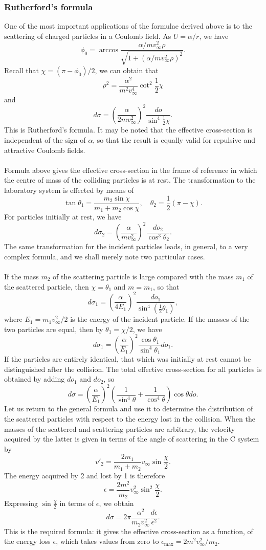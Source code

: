 \subsubsection{Rutherford's formula}
One of the most important applications of the formulae derived above is to the scattering of charged particles in a Coulomb field. As $U = {\alpha}/{r}$, we have
\[\phi_0 = \arccos \frac{\alpha/mv^2_{\infty}\rho}{\sqrt{1+(\alpha/mv^2_{\infty}\rho)^2}}.\]
Recall that $\chi = (\pi-\phi_0)/2$, we can obtain that
\[\rho^2 = \frac{\alpha^2}{m^2v_{\infty}^4} \cot^2 \frac{1}{2}\chi \]
and
\[d\sigma = \left( \frac{\alpha}{2mv_{\infty}^2} \right)^2 \frac{do}{\sin^4 \frac{1}{2}\chi}.\]
This is Rutherford's formula. It may be noted that the effective cross-section is independent of the sign of $\alpha$, so that the result is equally valid for repulsive and attractive Coulomb fields.
\\ \\
Formula above gives the effective cross-section in the frame of reference in which the centre of mass of the colliding particles is at rest. The transformation to the laboratory system is effected by means of
\[\tan\theta_1 = \frac{m_2\sin\chi}{m_1 + m_2 \cos\chi} ,\quad \theta_2 = \frac{1}{2}(\pi - \chi).\]
For particles initially at rest, we have
\[d\sigma_2 = \left ( \frac{\alpha}{mv^2_{\infty}} \right )^2 \frac{do_2}{\cos^3 \theta_2}.\]
The same transformation for the incident particles leads, in general, to a very complex formula, and we shall merely note two particular cases.
\\ \\
If the mass $m_2$ of the scattering particle is large compared with the mass $m_1$ of the scattered particle, then $\chi = \theta_1$ and $m = m_1$, so that
\[d\sigma_1 = \left ( \frac{\alpha}{4E_1}\right )^2 \frac{do_1}{\sin^4 (\frac{1}{2}\theta_1)} ,\]
where $E_1 = m_1v^2_{\infty}/2$ is the energy of the incident particle.
If the masses of the two particles are equal, then by $\theta_1 = {\chi}/{2}$, we have
\[d\sigma_1 =  \left ( \frac{\alpha}{E_1}\right )^2 \frac{\cos\theta_1}{\sin^4\theta_1} do_1.\]
If the particles are entirely identical, that which was initially at rest cannot be distinguished after the collision. The total effective cross-section for all
particles is obtained by adding $do_1$ and $do_2$, so
\[d\sigma = \left ( \frac{\alpha}{E_1}\right )^2 \left ( \frac{1}{\sin^4\theta} + \frac{1}{\cos^4\theta} \right )\cos\theta do.\]
Let us return to the general formula and use it to determine the distribution of the scattered particles with respect to the energy lost in the collision. 
When the masses of the scattered and scattering particles are arbitrary, the velocity acquired by the latter is given in terms of the angle of scattering in the C system by
\[v'_2 = \frac{2m_1}{m_1+m_2} v_{\infty} \sin \frac{\chi}{2}.\]
The energy acquired by 2 and lost by 1 is therefore
\[\epsilon = \frac{2m^2}{m_2} v_{\infty}^2 \sin^2 \frac{\chi}{2} .\]
Expressing $\sin \frac{\chi}{2}$ in terms of $\epsilon$, we obtain
\[d\sigma = 2\pi \frac{\alpha^2}{m_2 v^2_{\infty}} \frac{d\epsilon}{\epsilon^2}.\]
This is the required formula: it gives the effective cross-section as a function, of the energy loss $\epsilon$, which takes values from zero to $\epsilon_{\mathrm{max}} = 2m^2 v_{\infty}^2 /m_2$.

